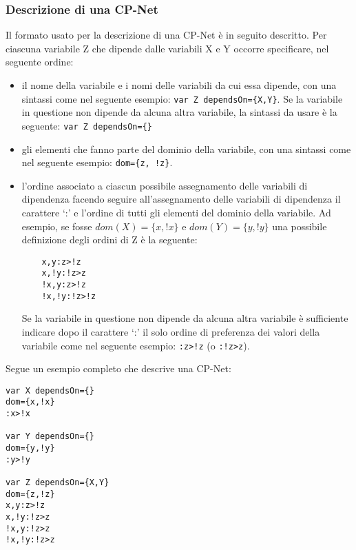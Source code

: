 \subsubsection{Descrizione di una CP-Net}
\label{sect:file}
Il formato usato per la descrizione di una CP-Net è in seguito
descritto.  Per ciascuna variabile Z che dipende dalle variabili X e Y
occorre specificare, nel seguente ordine:
\begin{itemize}
\item il nome della variabile e i nomi delle variabili da cui essa
  dipende, con una sintassi come nel seguente esempio: \texttt{var Z
    dependsOn=\{X,Y\}}. Se la variabile in questione non dipende da
  alcuna altra variabile, la sintassi da usare è la seguente:
  \texttt{var Z dependsOn=\{\}}
\item gli elementi che fanno parte del dominio della variabile, con
  una sintassi come nel seguente esempio: \texttt{dom=\{z, !z\}}.
\item l'ordine associato a ciascun possibile assegnamento delle
  variabili di dipendenza facendo seguire all'assegnamento delle
  variabili di dipendenza il carattere `:' e l'ordine di tutti gli
  elementi del dominio della variabile. Ad esempio, se fosse
  $dom(X)=\{x,!x\}$ e $dom(Y)=\{y,!y\}$ una possibile definizione
  degli ordini di Z è la seguente:
  \begin{verbatim}
    x,y:z>!z
    x,!y:!z>z
    !x,y:z>!z
    !x,!y:!z>!z
\end{verbatim}
  Se la variabile in questione non dipende da alcuna altra variabile è
  sufficiente indicare dopo il carattere `:' il solo ordine di
  preferenza dei valori della variabile come nel seguente esempio:
  \texttt{:z>!z} (o \texttt{:!z>z}).
\end{itemize}

Segue un esempio completo che descrive una CP-Net:
\begin{verbatim}
var X dependsOn={}
dom={x,!x}
:x>!x

var Y dependsOn={}
dom={y,!y}
:y>!y

var Z dependsOn={X,Y}
dom={z,!z}
x,y:z>!z
x,!y:!z>z
!x,y:!z>z
!x,!y:!z>z
\end{verbatim}